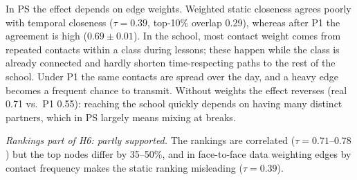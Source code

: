 In PS the effect depends on edge weights. Weighted static closeness agrees poorly with
temporal closeness ($\tau=0.39$, top-10\% overlap 0.29), whereas after P1 the agreement
is high ($0.69\pm0.01$). In the school, most contact weight comes from repeated contacts
within a class during lessons; these happen while the class is already connected and
hardly shorten time-respecting paths to the rest of the school. Under P1 the same contacts
are spread over the day, and a heavy edge becomes a frequent chance to transmit. Without
weights the effect reverses (real 0.71 vs.\ P1 0.55): reaching the school quickly depends
on having many distinct partners, which in PS largely means mixing at breaks.

\emph{Rankings part of H6: partly supported.} The rankings are correlated
($\tau=0.71$--$0.78$) but the top nodes differ by 35--50\%, and in face-to-face data
weighting edges by contact frequency makes the static ranking misleading ($\tau=0.39$).
